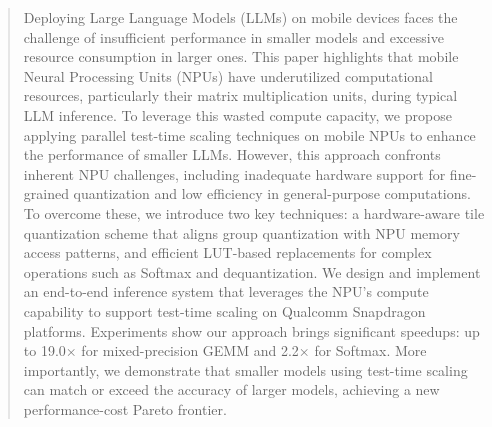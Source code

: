 \begin{abstract}
Deploying Large Language Models (LLMs) on mobile devices faces the challenge of insufficient performance in smaller models and excessive resource consumption in larger ones. This paper highlights that mobile Neural Processing Units (NPUs) have underutilized computational resources, particularly their matrix multiplication units, during typical LLM inference. To leverage this wasted compute capacity, we propose applying parallel test-time scaling techniques on mobile NPUs to enhance the performance of smaller LLMs. However, this approach confronts inherent NPU challenges, including inadequate hardware support for fine-grained quantization and low efficiency in general-purpose computations. To overcome these, we introduce two key techniques: a hardware-aware tile quantization scheme that aligns group quantization with NPU memory access patterns, and efficient LUT-based replacements for complex operations such as Softmax and dequantization. We design and implement an end-to-end inference system that leverages the NPU’s compute capability to support test-time scaling on Qualcomm Snapdragon platforms. Experiments show our approach brings significant speedups: up to 19.0× for mixed-precision GEMM and 2.2× for Softmax. More importantly, we demonstrate that smaller models using test-time scaling can match or exceed the accuracy of larger models, achieving a new performance-cost Pareto frontier. 

\end{abstract}